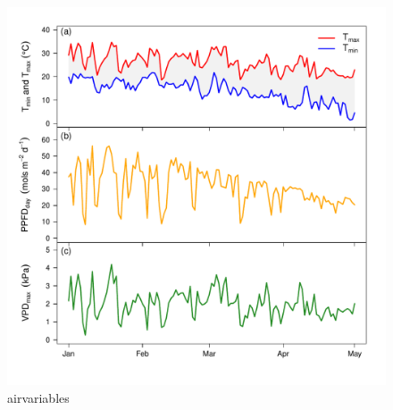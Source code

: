 \documentclass[a4paper]{article}\usepackage[]{graphicx}\usepackage[]{color}
\begin{document}
\begin{figure}[h!]
    \centering
    \includegraphics{airvars.pdf}
    \caption{airvariables}
    \label{fig:figure1}
\end{figure}
\end{document}
